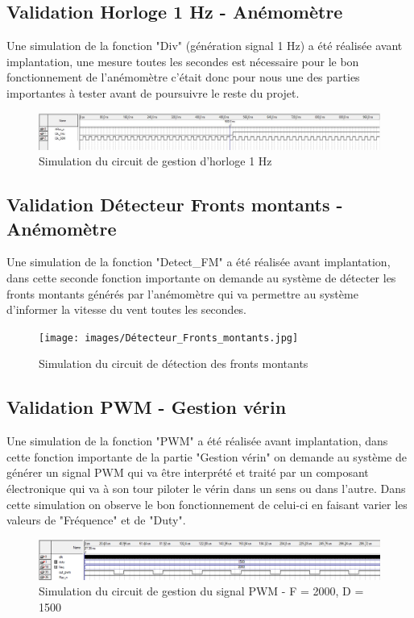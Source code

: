   \subsection{Validation Horloge 1 Hz - Anémomètre}

Une simulation de la fonction "Div" (génération signal 1 Hz) a été réalisée avant implantation, une mesure toutes les secondes est nécessaire pour le bon fonctionnement de l'anémomètre c'était donc pour nous une des parties importantes à tester avant de poursuivre le reste du projet.

\begin{figure}[h]
  \begin{center}
    \includegraphics[width=\textwidth]{images/Clk_1Hz.jpg}
    \caption{Simulation du circuit de gestion d'horloge 1 Hz}
  \end{center}
\end{figure}

\subsection{Validation Détecteur Fronts montants - Anémomètre}

Une simulation de la fonction "Detect\_FM" a été réalisée avant implantation, dans cette seconde fonction importante on demande au système de détecter les fronts montants générés par l'anémomètre qui va permettre au système d'informer la vitesse du vent toutes les secondes.

\begin{figure}[h]
  \begin{center}
    \texttt{[image: images/Détecteur\_Fronts\_montants.jpg]}
    \caption{Simulation du circuit de détection des fronts montants}
  \end{center}
\end{figure}

\subsection{Validation PWM - Gestion vérin}

Une simulation de la fonction "PWM" a été réalisée avant implantation, dans cette fonction importante de la partie "Gestion vérin" on demande au système de générer un signal PWM qui va être interprété et traité par un composant électronique qui va à son tour piloter le vérin dans un sens ou dans l'autre. Dans cette simulation on observe le bon fonctionnement de celui-ci en faisant varier les valeurs de "Fréquence" et de "Duty".

\begin{figure}[h]
  \begin{center}
    \includegraphics[width=\textwidth]{images/pwm.png}
    \caption{Simulation du circuit de gestion du signal PWM - F = 2000, D = 1500}
  \end{center}
\end{figure}